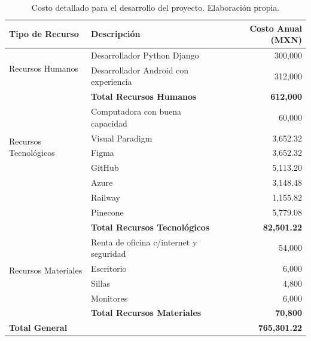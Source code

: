 \begin{table}[h!]
	\centering
	\begin{tabular}{|l|l|r|}
		\hline
		\textbf{Tipo de Recurso}      & \textbf{Descripción}                          & \textbf{Costo Anual (MXN)} \\ \hline
		\multirow{2}{*}{Recursos Humanos} & Desarrollador Python Django                   & 300,000                   \\ 
		& Desarrollador Android con experiencia         & 312,000                   \\ \hline
		& \textbf{Total Recursos Humanos}              & \textbf{612,000}          \\ \hline
		\multirow{5}{*}{Recursos Tecnológicos} & Computadora con buena capacidad               & 60,000                    \\ 
		& Visual Paradigm                               & 3,652.32                  \\ 
		& Figma                                        & 3,652.32                  \\ 
		& GitHub                                       & 5,113.20                  \\ 
		& Azure                                 & 3,148.48                         \\ 
		& Railway                                & 1,155.82                         \\ 
		& Pinecone                               & 5,779.08                       \\    
		\hline
		& \textbf{Total Recursos Tecnológicos}         & \textbf{82,501.22}        \\ \hline
		\multirow{4}{*}{Recursos Materiales} & Renta de oficina c/internet y seguridad       & 54,000                    \\ 
		& Escritorio                                   & 6,000                     \\ 
		& Sillas                                       & 4,800                     \\ 
		& Monitores                                    & 6,000                     \\ \hline
		& \textbf{Total Recursos Materiales}           & \textbf{70,800}           \\ \hline
		\textbf{Total General}        &                                              & \textbf{765,301.22}       \\ \hline
	\end{tabular}
	\caption{Costo detallado para el desarrollo del proyecto. Elaboración propia.}
	\label{tabla:costo-proyecto}
\end{table}


